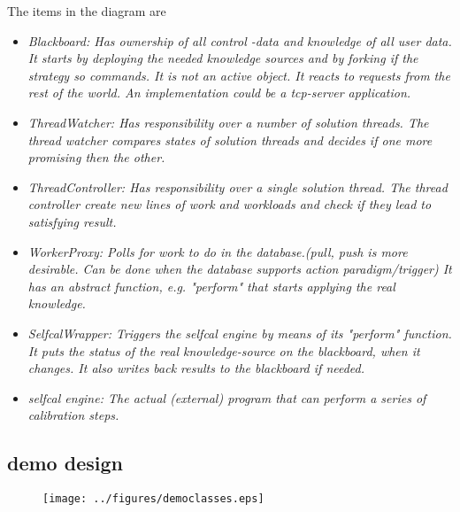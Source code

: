 \documentclass[]{lofar}
\begin{document}
      The items in the diagram are \begin{itemize}

      \item \em{Blackboard}: Has ownership of all control -data and knowledge of all
      user data. It starts by deploying the needed knowledge sources
      and by forking if the strategy so commands. It is not an active
      object. It reacts to requests from the rest of the world. An
      implementation could be a tcp-server application.

      \item \em{ThreadWatcher}: Has responsibility over a number of
      solution threads. The thread watcher compares states of solution
      threads and decides if one more promising then the other.

      \item \em{ThreadController}: Has responsibility over a single
      solution thread. The thread controller create new lines of work
      and workloads and check if they lead to satisfying result.


      \item \em{WorkerProxy}: Polls for work to do in the
      database.(pull, push is more desirable. Can be done when the
      database supports action paradigm/trigger) It has an abstract
      function, e.g. "perform" that starts applying the real
      knowledge.

      \item \em{SelfcalWrapper}: Triggers the selfcal engine by means of its "perform"
      function. It puts the status of the real knowledge-source on the
      blackboard, when it changes. It also writes back results to the
      blackboard if needed.

      \item \em{selfcal engine}: The actual (external) program that
      can perform a series of calibration steps.

      \end{itemize}

    \subsection{demo design}
    \label{subsec:demo-design}

      \begin{figure}
        \texttt{[image: ../figures/democlasses.eps]}
        \hypertarget{fig:democlasses}{}
        \caption{\label{fig:democlasses}}
      \end{figure}
\end{document}
